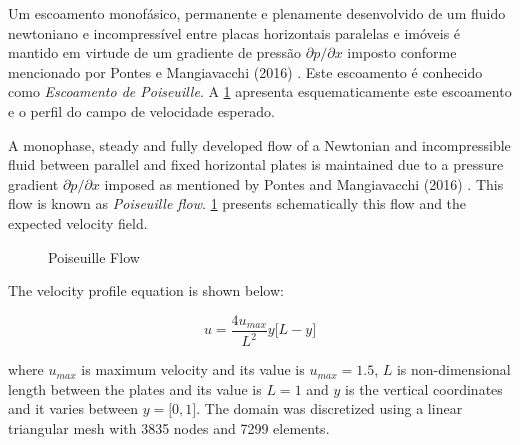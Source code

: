 Um escoamento monofásico, permanente e plenamente desenvolvido
de um fluido newtoniano e incompressível 
entre placas horizontais paralelas e imóveis é 
mantido em virtude de um gradiente de pressão 
$\partial p/\partial x$ imposto conforme mencionado por Pontes e Mangiavacchi (2016) \cite{pontes2016}.
Este escoamento é conhecido como \textit{Escoamento de Poiseuille}.
A \ref{poiseuille} apresenta esquematicamente este escoamento e
o perfil do campo de velocidade esperado.

A monophase, steady and fully developed flow of a Newtonian 
and incompressible fluid between parallel and fixed horizontal 
plates is maintained due to a pressure gradient 
$\partial p/ \partial x$ imposed as mentioned by Pontes 
and Mangiavacchi (2016) \cite{pontes2016}. 
This flow is known as \textit{Poiseuille flow}. 
\ref{poiseuille} presents schematically this flow and 
the expected velocity field.

\begin{figure}[H]
\begin{center}
\end{center}
\caption{Poiseuille Flow}
\label{poiseuille}
\end{figure}

\noindent
The velocity profile equation is shown below:

\begin{equation}
 u = \frac{4 u_{max}}{L^2} y \big[ L - y \big]
\end{equation}

\medskip
\noindent
where $u_{max}$ is maximum velocity and its value is 
$u_{max} = 1.5$, $L$ is non-dimensional length 
between the plates and its value is 
$L = 1$
and $y$ is the vertical coordinates and it varies 
between $y = \big[ 0,1 \big]$.
The domain was discretized using a linear triangular mesh
with 3835 nodes and 7299 elements.

